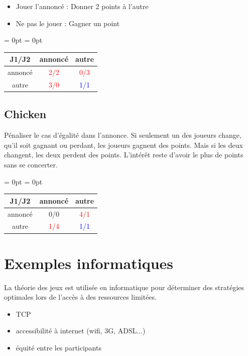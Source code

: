 \documentclass{article}
\begin{document}
\begin{itemize}
    \item Jouer l'annoncé : Donner 2 points à l'autre
    \item Ne pas le jouer : Gagner un point
\end{itemize}

\begin{table}[H]
\renewcommand{\arraystretch}{2}%
\centering
\aboverulesep = 0pt
\belowrulesep = 0pt
\begin{tabular}{c|c|c}
    J1/J2 & annoncé & autre  \\ \midrule
    annoncé & \textcolor{red}{2/2} & \textcolor{red}{0/3}  \\ \midrule
    autre & \textcolor{red}{3/0} & \textcolor{blue}{1/1} \\ 
\end{tabular}
\end{table}

\subsection{Chicken}
\label{variante:poulet}
Pénaliser le cas d'égalité dans l'annonce.
Si seulement un des joueurs change, qu'il soit gagnant ou perdant, les joueurs gagnent des points. Mais si les deux changent, les deux perdent des points. L'intérêt reste d'avoir le plus de points sans se concerter.

\begin{table}[H]
\renewcommand{\arraystretch}{2}%
\centering
\aboverulesep = 0pt
\belowrulesep = 0pt
\begin{tabular}{c|c|c}
    J1/J2 & annoncé & autre  \\ \midrule
    annoncé & {0/0} & \textcolor{red}{4/1}  \\ \midrule
    autre & \textcolor{red}{1/4} & \textcolor{blue}{1/1} \\ 
\end{tabular}
\end{table}

\section{Exemples informatiques}
La théorie des jeux est utilisée en informatique pour déterminer des stratégies optimales lors de l'accès à des ressources limitées.
\begin{itemize}
    \item TCP
    \item accessibilité à internet (wifi, 3G, ADSL...)
    \item équité entre les participants
\end{itemize}
\end{document}
